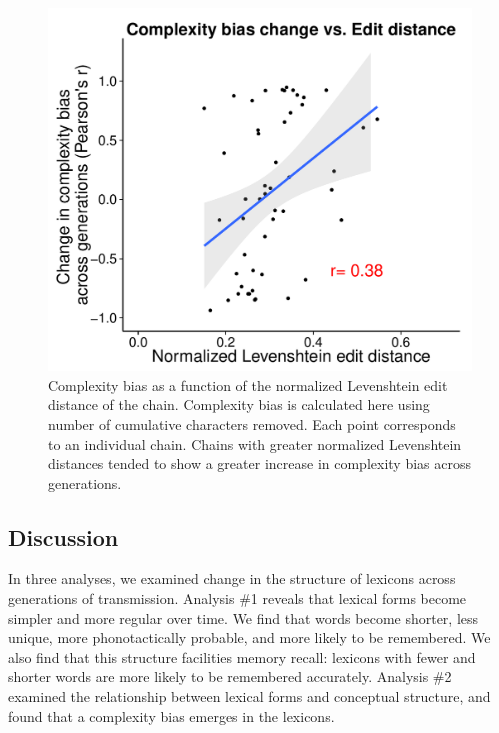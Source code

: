 \begin{figure}[t]
\begin{center}
\includegraphics[width = .8\linewidth]{figs/change_plot.pdf}
\end{center}
\vspace{-.5em}
\caption{Complexity bias as a function of the normalized Levenshtein edit distance of the chain. Complexity bias is calculated here using number of cumulative characters removed. Each point corresponds to an individual chain. Chains with greater normalized Levenshtein distances tended to show a greater increase in complexity bias across generations.}
\vspace{-1.5em}
\label{fig:levcbias}
\end{figure}


\subsection{Discussion}

In three analyses, we examined change in the structure of lexicons across generations of transmission. Analysis \#1 reveals that lexical forms become simpler and more regular over time. We find that words become shorter, less unique, more phonotactically probable, and more likely to be remembered. We also find that this structure facilities memory recall: lexicons with fewer and shorter words are more likely to be remembered accurately. Analysis \#2 examined the relationship between lexical forms and conceptual structure, and found that a complexity bias emerges in the lexicons. 

